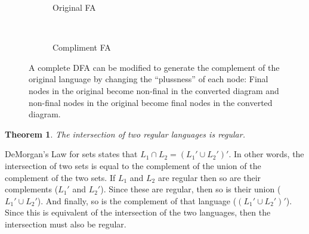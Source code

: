 \documentclass[letterpaper,12pt,openany,reqno]{book}%
\newcommand{\fanonterminalnode}[2] {\node at (#1) (#2) [circle, draw, minimum size=24pt] {#2};}
\newcommand{\faarctransition}[5] {\draw [->] (#1) to[out=#4, in=#5] node  [midway, above] {#3} (#2) ;}
\newtheorem{theorem}{Theorem}
\begin{document}
\begin{figure}[htb]
\centering

\begin{subfigure}[b]{0.45\textwidth}
\centering
{}
\caption{Original FA}
\end{subfigure}
~
\begin{subfigure}[b]{0.45\textwidth}
\centering
{}
\caption{Compliment FA}
\end{subfigure}

 \caption[Complement of a Regular Language]{A complete DFA can be modified to generate the complement of the original language by changing the ``plussness'' of each node: Final nodes in the original become non-final in the converted diagram and non-final nodes in the original become final nodes in the converted diagram.}
  \label{F.RL.Compliment}
\end{figure}

\begin{theorem}
The intersection of two regular languages is regular.
\end{theorem}

DeMorgan's Law for sets states that $L_1 \cap L_2 = (L_1' \cup L_2')'$. In other words, the intersection of two sets is equal to the complement of the union of the complement of the two sets. If $L_1$ and $L_2$ are regular then so are their complements ($L_1'$ and $L_2'$). Since these are regular, then so is their union ($L_1' \cup L_2'$). And finally, so is the complement of that language ($(L_1' \cup L_2')'$). Since this is equivalent of the intersection of the two languages, then the intersection must also be regular.
\end{document}
